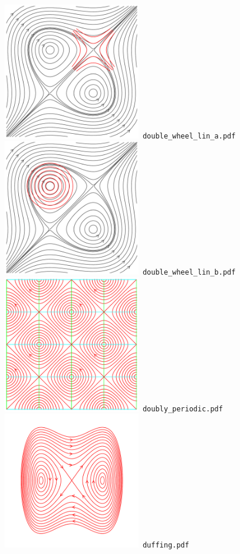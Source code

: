 \documentclass[a4paper]{amsart}
\begin{document}
\includegraphics[width=6cm]{double_wheel_lin_a.pdf}\verb+ double_wheel_lin_a.pdf+\\
\includegraphics[width=6cm]{double_wheel_lin_b.pdf}\verb+ double_wheel_lin_b.pdf+\\
\includegraphics[width=6cm]{doubly_periodic.pdf}\verb+ doubly_periodic.pdf+\\
\includegraphics[width=6cm]{duffing.pdf}\verb+ duffing.pdf+\\
\end{document}
